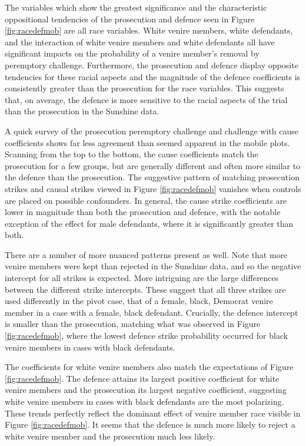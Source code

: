 The variables which show the greatest significance and the characteristic
oppositional tendencies of the prosecution and defence seen in Figure \ref{fig:racedefmob} are all race variables. White venire members, white
defendants, and the interaction of white venire members and white defendants
all have significant impacts on the probability of a venire member's
removal by peremptory challenge. Furthermore, the prosecution and
defence display opposite tendencies for these racial aspects and
the magnitude of the defence coefficients is consistently greater than
the prosecution for the race variables. This suggests that, on
average, the defence is more sensitive to the racial aspects of the
trial than the prosecution in the Sunshine data.

A quick survey of the prosecution peremptory challenge and challenge with cause coefficients shows far less agreement than seemed apparent in the mobile
plots. Scanning from the top to the bottom, the cause coefficients match the prosecution for a few groups, but are generally
different and often more similar to the defence than the prosecution. The suggestive pattern of matching prosecution strikes
and causal strikes viewed in Figure \ref{fig:racedefmob} vanishes when controls are placed on possible confounders. In general, the cause strike
coefficients are lower in magnitude than both the prosecution and defence, with the notable exception of the effect for male
defendants, where it is significantly greater than both.

There are a number of more nuanced patterns present as well. Note that
more venire members were kept than rejected in the Sunshine data, and so the
negative intercept for all strikes is expected. More intriguing are the large differences
between the different strike intercepts. These suggest that all three
strikes are used differently in the pivot case, that of a female, black,
Democrat venire member in a case with a female, black
defendant. Crucially, the defence intercept is smaller than the prosecution, matching what was observed in Figure \ref{fig:racedefmob}, where the lowest defence strike
probability occurred for black venire members in cases with black
defendants. 

The coefficients for white venire members also match the expectations of Figure \ref{fig:racedefmob}. The defence attains its
largest positive coefficient for white venire members and the prosecution its
largest negative coefficient, suggesting white venire members in cases
with black defendants are the most polarizing. These trends perfectly
reflect the dominant effect of venire member
race visible in Figure \ref{fig:racedefmob}. It seems that the defence is much more
likely to reject a white venire member and the prosecution much less
likely.

